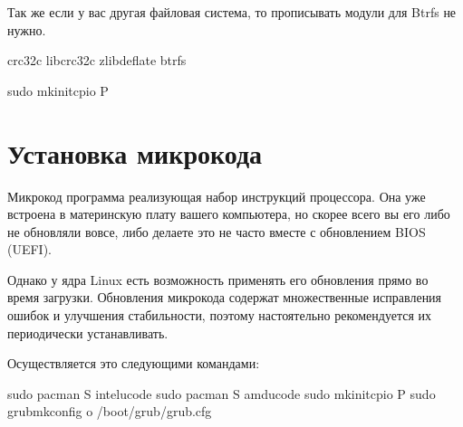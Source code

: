 \documentclass[letterpaper,10pt,russian,openany]{sphinxmanual}
\begin{document}
\sphinxAtStartPar
Так же если у вас другая файловая система, то прописывать модули для Btrfs не нужно.

\begin{sphinxVerbatim}[commandchars=\\\{\}]
crc32c libcrc32c zlib\PYGZus{}deflate btrfs
\end{sphinxVerbatim}


\begin{sphinxVerbatim}[commandchars=\\\{\}]
sudo mkinitcpio \PYGZhy{}P                                 
\end{sphinxVerbatim}

\ignorespaces 

\section{Установка микрокода}
\label{\detokenize{source/first-steps:microcode-installation}}\label{\detokenize{source/first-steps:index-10}}\label{\detokenize{source/first-steps:id9}}
\sphinxAtStartPar
Микрокод \sphinxhyphen{} программа реализующая набор инструкций процессора.
Она уже встроена в материнскую плату вашего компьютера,
но скорее всего вы его либо не обновляли вовсе, либо делаете это не часто вместе с обновлением BIOS (UEFI).

\sphinxAtStartPar
Однако у ядра Linux есть возможность применять его обновления прямо во время загрузки.
Обновления микрокода содержат множественные исправления ошибок и улучшения стабильности,
поэтому настоятельно рекомендуется их периодически устанавливать.

\sphinxAtStartPar
Осуществляется это следующими командами:

\begin{sphinxVerbatim}[commandchars=\\\{\}]
sudo pacman \PYGZhy{}S intel\PYGZhy{}ucode                  
sudo pacman \PYGZhy{}S amd\PYGZhy{}ucode                    
sudo mkinitcpio \PYGZhy{}P                          
sudo grub\PYGZhy{}mkconfig \PYGZhy{}o /boot/grub/grub.cfg   
\end{sphinxVerbatim}
\end{document}
